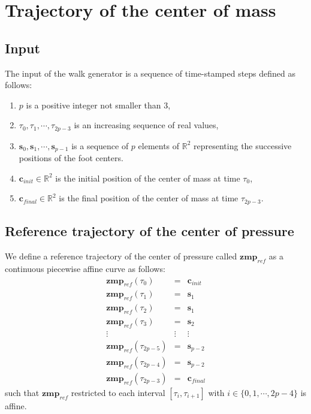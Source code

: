 \documentclass {article}
\newcommand\real{\mathbb{R}}
\newcommand\step{\mathbf{s}}
\newcommand\com{\mathbf{c}}
\newcommand\zmpref{\mathbf{zmp}_{ref}}
\begin{document}
\section {Trajectory of the center of mass}

\subsection {Input}

The input of the walk generator is a sequence of time-stamped steps defined
as follows:
\begin{enumerate}
\item $p$ is a positive integer not smaller than 3,
\item $\tau_0, \tau_1, \cdots, \tau_{2p-3}$ is an increasing sequence of real values,
\item $\step_0, \step_1, \cdots, \step_{p-1}$ is a sequence of $p$ elements of
  $\real^2$ representing the successive positions of the foot centers.
\item $\com_{init}\in\real^2$ is the initial position of the center of mass at
  time $\tau_0$,
\item $\com_{final}\in\real^2$ is the final position of the center of mass at time
  $\tau_{2p-3}$.
\end{enumerate}

\subsection {Reference trajectory of the center of pressure}

We define a reference trajectory of the center of pressure called
$\zmpref$ as a continuous piecewise affine curve as follows:
\begin{eqnarray*}
\zmpref (\tau_0) &=& \com_{init} \\
\zmpref (\tau_1) &=& \step_1 \\
\zmpref (\tau_2) &=& \step_1 \\
\zmpref (\tau_3) &=& \step_2 \\
\vdots & \vdots & \vdots \\
\zmpref (\tau_{2p-5}) &=& \step_{p-2} \\
\zmpref (\tau_{2p-4}) &=& \step_{p-2} \\
\zmpref (\tau_{2p-3}) &=& \com_{final}
\end{eqnarray*}
such that $\zmpref$ restricted to each interval $[\tau_i,\tau_{i+1}]$ with
$i\in\{0,1,\cdots,2p-4\}$ is affine.
\end{document}
